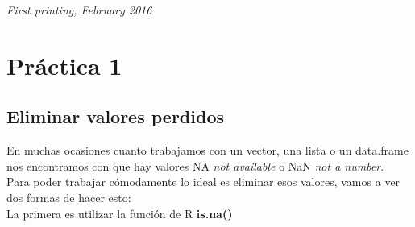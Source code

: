 \documentclass[11pt,fleqn]{book} %
\begin{document}
\noindent \textit{First printing, February 2016} %




\pagestyle{empty} %
 
\tableofcontents %


\pagestyle{fancy} %





\chapter{Práctica 1}

\section{Eliminar valores perdidos}

En muchas ocasiones cuanto trabajamos con un vector, una lista o un data.frame nos encontramos con que hay valores NA \textit{not available} o NaN \textit{not a number}.\\
Para poder trabajar cómodamente lo ideal es eliminar esos valores, vamos a ver dos formas de hacer esto:\\
La primera es utilizar la función de R \textbf{is.na()}
\end{document}
